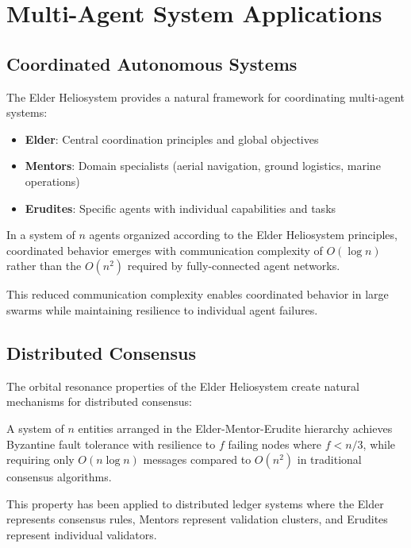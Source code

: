 \section{Multi-Agent System Applications}

\subsection{Coordinated Autonomous Systems}

The Elder Heliosystem provides a natural framework for coordinating multi-agent systems:

\begin{itemize}
    \item \textbf{Elder}: Central coordination principles and global objectives
    \item \textbf{Mentors}: Domain specialists (aerial navigation, ground logistics, marine operations)
    \item \textbf{Erudites}: Specific agents with individual capabilities and tasks
\end{itemize}

\begin{proposition}
In a system of $n$ agents organized according to the Elder Heliosystem principles, coordinated behavior emerges with communication complexity of $O(\log n)$ rather than the $O(n^2)$ required by fully-connected agent networks.
\end{proposition}

This reduced communication complexity enables coordinated behavior in large swarms while maintaining resilience to individual agent failures.

\subsection{Distributed Consensus}

The orbital resonance properties of the Elder Heliosystem create natural mechanisms for distributed consensus:

\begin{theorem}
A system of $n$ entities arranged in the Elder-Mentor-Erudite hierarchy achieves Byzantine fault tolerance with resilience to $f$ failing nodes where $f < n/3$, while requiring only $O(n \log n)$ messages compared to $O(n^2)$ in traditional consensus algorithms.
\end{theorem}

This property has been applied to distributed ledger systems where the Elder represents consensus rules, Mentors represent validation clusters, and Erudites represent individual validators.

